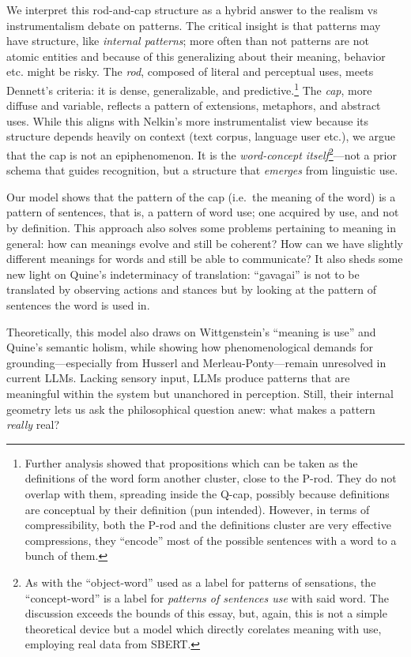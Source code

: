 \documentclass[12pt]{article}
\begin{document}
We interpret this rod-and-cap structure as a hybrid answer to the realism vs instrumentalism debate on patterns. The critical insight is that patterns may have structure, like \emph{internal patterns}; more often than not patterns are not atomic entities and because of this generalizing about their meaning, behavior etc. might be risky. The \emph{rod}, composed of literal and perceptual uses, meets Dennett's criteria: it is dense, generalizable, and predictive.\footnote{Further analysis showed that propositions which can be taken as the definitions of the word form another cluster, close to the P-rod. They do not overlap with them, spreading inside the Q-cap, possibly because definitions are conceptual by their definition (pun intended). However, in terms of compressibility, both the P-rod and the definitions cluster are very effective compressions, they ``encode'' most of the possible sentences with a word to a bunch of them.} The \emph{cap}, more diffuse and variable, reflects a pattern of extensions, metaphors, and abstract uses. While this aligns with Nelkin's more instrumentalist view because its structure depends heavily on context (text corpus, language user etc.), we argue that the cap is not an epiphenomenon. It is the \emph{word-concept itself}\footnote{As with the ``object-word'' used as a label for patterns of sensations, the ``concept-word'' is a label for \emph{patterns of sentences use} with said word. The discussion exceeds the bounds of this essay, but, again, this is not a simple theoretical device but a model which directly corelates meaning with use, employing real data from SBERT.}---not a prior schema that guides recognition, but a structure that \emph{emerges} from linguistic use.

Our model shows that the pattern of the cap (i.e.~the meaning of the word) is a pattern of sentences, that is, a pattern of word use; one acquired by use, and not by definition. This approach also solves some problems pertaining to meaning in general: how can meanings evolve and still be coherent? How can we have slightly different meanings for words and still be able to communicate? It also sheds some new light on Quine's indeterminacy of translation: ``gavagai'' is not to be translated by observing actions and stances but by looking at the pattern of sentences the word is used in.

Theoretically, this model also draws on Wittgenstein's ``meaning is use'' and Quine's semantic holism, while showing how phenomenological demands for grounding---especially from Husserl and Merleau-Ponty---remain unresolved in current LLMs. Lacking sensory input, LLMs produce patterns that are meaningful within the system but unanchored in perception. Still, their internal geometry lets us ask the philosophical question anew: what makes a pattern \emph{really} real?
\end{document}
